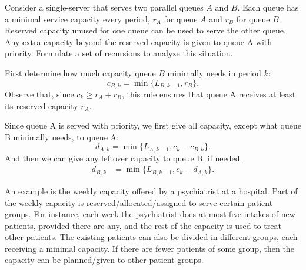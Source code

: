 \begin{extra}  Consider a single-server that serves two parallel queues $A$ and $B$.
 Each queue has a minimal service capacity every period, $r_A$ for queue $A$ and $r_B$ for queue $B$.
 Reserved capacity unused for one queue can be used to serve the other queue.
 Any extra capacity beyond the reserved capacity is given to queue A with priority.
 Formulate a set of recursions to analyze this situation.
\begin{solution}
 First determine how much capacity queue $B$ minimally needs in
 period $k$:
 \begin{equation*}
 c_{B,k} = \min\{L_{B,k-1}, r_B\}.
 \end{equation*}
 Observe that, since $c_k \geq r_A + r_B$, this rule ensures that
 queue A receives at least its reserved capacity $r_A$. 

 Since queue A is served with priority, we first give all capacity,
 except what queue B minimally needs, to queue A:
 \begin{equation*}
d_{A,k} = \min\{L_{A,k-1}, c_k-c_{B,k}\}.
\end{equation*}
And then we can give any leftover capacity to queue B, if needed. 
\begin{align*}
d_{B, k} &= \min\{L_{B, k-1}, c_k-d_{A,k}\}.
\end{align*}

An example is the weekly capacity offered by a psychiatrist at a hospital.
Part of the weekly capacity is reserved/allocated/assigned to serve certain patient groups.
For instance, each week the psychiatrist does at most five intakes of new patients, provided there are any, and the rest of the capacity is used to treat other patients.
The existing patients can also be divided in different groups, each receiving a minimal capacity.
If there are fewer patients of some group, then the capacity can be planned/given to other patient groups.
\end{solution}
\end{extra}


